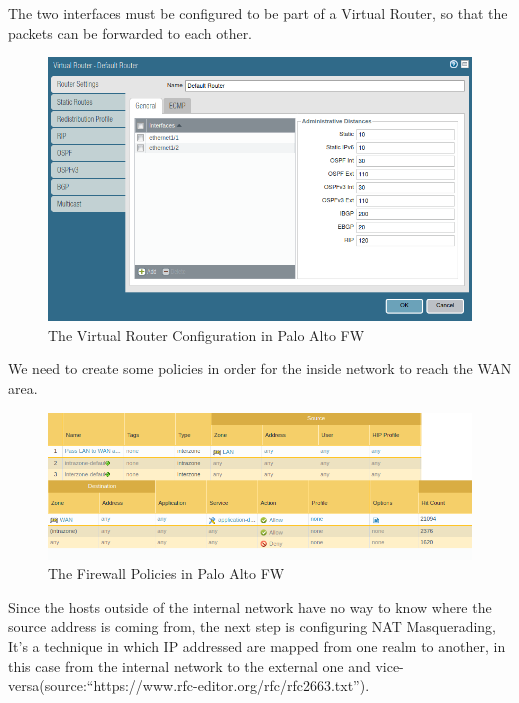 \documentclass[status=normal,cover=tesi,language=en]{gmeepd}
\begin{document}
The two interfaces must be configured to be part of a Virtual Router, so that the packets can be forwarded to each other.

\begin{figure}[!hb]
 \centering
 \includegraphics[width=13cm]{img/virtual_router.png}
 \caption{The Virtual Router Configuration in Palo Alto FW}
 \label{Virtual Router Configuration}
\end{figure}


We need to create some policies in order for the inside network to reach the WAN area.

\begin{figure}[!hb]
 \centering
 \includegraphics[width=13cm]{img/Firewall_Policy.png}
 \caption{The Firewall Policies in Palo Alto FW}
 \label{Firewall Policies}
\end{figure}


Since the hosts outside of the internal network have no way to know where the source address is coming from, the next step is configuring NAT Masquerading, It's a technique in which IP addressed are mapped from one realm to another, in this case from the internal network to the external one and vice-versa(source:``https://www.rfc-editor.org/rfc/rfc2663.txt'').
\end{document}
